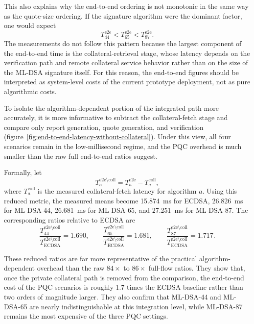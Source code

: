 This also explains why the end-to-end ordering is not monotonic in the same way as the quote-size ordering. If the signature algorithm were the dominant factor, one would expect
\[
  T^{\mathrm{e2e}}_{44} < T^{\mathrm{e2e}}_{65} < T^{\mathrm{e2e}}_{87}.
\]
The measurements do not follow this pattern because the largest component of
the end-to-end time is the collateral-retrieval stage, whose latency depends
on the verification path and remote collateral service behavior rather than on
the size of the ML-DSA signature itself. For this reason, the end-to-end
figures should be interpreted as system-level costs of the current prototype
deployment, not as pure algorithmic costs.

To isolate the algorithm-dependent portion of the integrated path more
accurately, it is more informative to subtract the collateral-fetch stage and
compare only report generation, quote generation, and verification
(figure~\ref{fig:end-to-end-latency-without-collateral}). Under this view, all
four scenarios remain in the low-millisecond regime, and the PQC overhead is
much smaller than the raw full end-to-end ratios suggest.

Formally, let
\[
  T^{\mathrm{e2e}\setminus\mathrm{coll}}_a
  =
  T^{\mathrm{e2e}}_a - T^{\mathrm{coll}}_a,
\]
where \(T^{\mathrm{coll}}_a\) is the measured collateral-fetch latency for
algorithm \(a\). Using this reduced metric, the measured means become
15.874~ms for ECDSA, 26.826~ms for ML-DSA-44, 26.681~ms for ML-DSA-65, and
27.251~ms for ML-DSA-87. The corresponding ratios relative to ECDSA are
\[
  \frac{T^{\mathrm{e2e}\setminus\mathrm{coll}}_{44}}
       {T^{\mathrm{e2e}\setminus\mathrm{coll}}_{\mathrm{ECDSA}}}
  = 1.690,
  \qquad
  \frac{T^{\mathrm{e2e}\setminus\mathrm{coll}}_{65}}
       {T^{\mathrm{e2e}\setminus\mathrm{coll}}_{\mathrm{ECDSA}}}
  = 1.681,
  \qquad
  \frac{T^{\mathrm{e2e}\setminus\mathrm{coll}}_{87}}
       {T^{\mathrm{e2e}\setminus\mathrm{coll}}_{\mathrm{ECDSA}}}
  = 1.717.
\]

These reduced ratios are far more representative of the practical
algorithm-dependent overhead than the raw \(84\times\) to \(86\times\)
full-flow ratios. They show that, once the private collateral path is removed
from the comparison, the end-to-end cost of the PQC scenarios is roughly
1.7 times the ECDSA baseline rather than two orders of magnitude larger. They
also confirm that ML-DSA-44 and ML-DSA-65 are nearly indistinguishable at this
integration level, while ML-DSA-87 remains the most expensive of the three
PQC settings.

